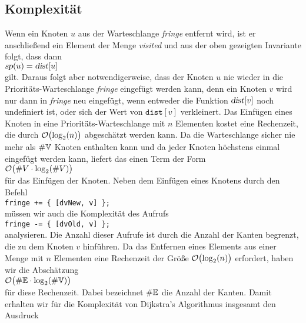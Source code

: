 \subsection{Komplexit\"at}
Wenn ein Knoten $u$ aus der Warteschlange \textsl{fringe} entfernt wird, ist er anschlie{\ss}end ein Element der
Menge \textsl{visited} und aus der oben gezeigten Invariante folgt, dass dann 
\\[0.2cm]
\hspace*{1.3cm}
$\textsl{sp}(u) = \textsl{dist}[u]$
\\[0.2cm]
gilt.  Daraus folgt aber notwendigerweise, dass der Knoten $u$ nie wieder in die Priorit\"ats-Warteschlange
\textsl{fringe}
eingef\"ugt werden kann, denn ein Knoten $v$ wird nur dann in \textsl{fringe} neu eingef\"ugt, wenn
entweder die Funktion $\textsl{dist}[v]$ noch undefiniert ist, oder sich der Wert von
$\texttt{dist}[v]$ verkleinert.  
Das Einf\"ugen eines Knoten in eine Priorit\"ats-Warteschlange mit $n$
Elementen kostet eine Rechenzeit, die durch $\mathcal{O}\bigl(\log_2(n)\bigr)$ abgesch\"atzt werden kann.  Da die
Warteschlange sicher nie mehr als $\#{\mathbb V}$ Knoten enthalten kann und da jeder Knoten h\"ochstens einmal eingef\"ugt
werden kann, liefert das einen Term der Form 
\\[0.2cm]
\hspace*{1.3cm}
$\mathcal{O}\bigl(\#V \cdot \log_2(\#V)\bigr)$ 
\\[0.2cm]
f\"ur das Einf\"ugen der Knoten.  Neben dem Einf\"ugen eines Knotens durch den Befehl
\\[0.2cm]
\hspace*{1.3cm}
\texttt{fringe += \{ [dvNew, v] \};}
\\[0.2cm]
m\"ussen wir auch die Komplexit\"at des Aufrufs
\\[0.2cm]
\hspace*{1.3cm}
\texttt{fringe -= \{ [dvOld, v] \};} 
\\[0.2cm]
analysieren.
Die Anzahl dieser Aufrufe ist durch die Anzahl der Kanten begrenzt, die zu dem Knoten $v$ hinf\"uhren.
Da das Entfernen eines Elements aus einer Menge mit $n$ Elementen eine Rechenzeit
der Gr\"o{\ss}e $\mathcal{O}\bigl(\log_2(n)\bigr)$ erfordert, haben wir die Absch\"atzung
\\[0.2cm]
\hspace*{1.3cm}
$\mathcal{O}\bigl(\#{\mathbb E} \cdot \log_2(\#{\mathbb V})\bigr)$
\\[0.2cm]
f\"ur diese Rechenzeit.
Dabei bezeichnet $\#{\mathbb E}$ die Anzahl der Kanten. Damit erhalten wir f\"ur die
Komplexit\"at von Dijkstra's Algorithmus insgesamt den Ausdruck \\[0.2cm]
